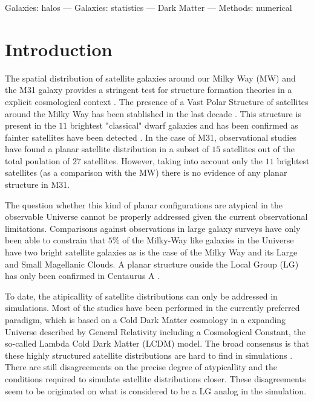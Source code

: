 \documentclass[a4paper,fleqn,usenatbib]{mnras}
\begin{document}
\begin{keywords}Galaxies: halos --- Galaxies: statistics --- Dark
  Matter --- Methods: numerical  
\end{keywords}

\section{Introduction}

The spatial distribution of satellite galaxies around our Milky Way
(MW) and the M31 galaxy provides a stringent test for structure
formation theories in a explicit cosmological context
\citep{2015ApJ...815...19P, 2016MNRAS.457.1931S, 2016arXiv160601516L}.  
The presence of a Vast Polar Structure of satellites around the Milky
Way has been stablished in the last decade \citep{2013MNRAS.435.1928P}.
This structure is present in the $11$ brightest "classical" dwarf
galaxies and has been confirmed as fainter satellites have been
detected \citep{2014MNRAS.441.2124B}. %
In the case of M31, observational studies have found a planar satellite
distribution in a subset of $15$ satellites out of the 
total poulation of $27$ satellites.\citep{2013ApJ...766..120C,
2013Natur.493...62I} 
However, taking into account only the $11$ brightest satellites (as a
comparison with the MW) there is no evidence of any planar structure
in M31.

The question whether this kind of planar configurations are atypical
in the observable Universe cannot be properly addressed given the
current observational limitations. %
Comparisons against observations in large galaxy surveys have only
been able to constrain that $5\%$ of the Milky-Way like galaxies in
the Universe have two bright satellite galaxies as is the case of the
Milky Way and its Large and Small Magellanic Clouds.%
A planar structure ouside the Local Group (LG) has only been confirmed
in Centaurus A \citep{muller2018whirling}. 

To date, the atipicallity of satellite distributions can only be
addressed in simulations.
Most of the studies have been performed in the currently preferred
paradigm, which is based on a Cold Dark Matter cosmology in a expanding
Universe described by General Relativity including a Cosmological
Constant, the so-called Lambda Cold Dark Matter (LCDM) model.
The broad consensus is that these highly structured satellite distributions
are hard to find in simulations \citep{}.  
There are still disagreements on the precise degree of atypicallity
and the conditions required to simulate satellite distributions closer.
These disagreements seem to be originated on what is considered to be
a LG analog in the simulation.
\end{document}
